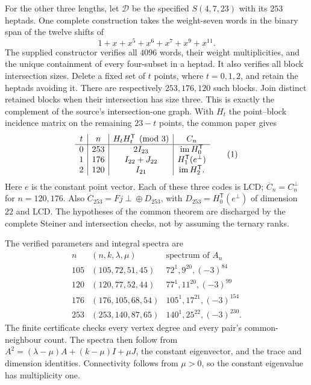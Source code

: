 For the other three lengths, let $\mathcal D$ be the specified
$S(4,7,23)$ with its $253$ heptads. One complete construction takes the
weight-seven words in the binary span of the twelve shifts of
\[
 1+x+x^5+x^6+x^7+x^9+x^{11}.
\]
The supplied constructor verifies all $4096$ words, their weight
multiplicities, and the unique containment of every four-subset in a
heptad. It also verifies all block intersection sizes. Delete a fixed set
of $t$ points, where $t=0,1,2$, and retain the heptads avoiding it. There
are respectively $253,176,120$ such blocks. Join distinct retained blocks
when their intersection has size three. This is exactly the complement
of the source's intersection-one graph. With $H_t$ the point--block
incidence matrix on the remaining $23-t$ points, the common paper
\cite[Theorem~2.2]{U} gives
\[
\begin{array}{c|c|c|c}
 t&n&H_tH_t^{\mathsf T}\pmod3&C_n\\\hline
 0&253&2I_{23}&\operatorname{im} H_0^{\mathsf T}\\
 1&176&I_{22}+J_{22}&H_1^{\mathsf T}(e^\perp)\\
 2&120&I_{21}&\operatorname{im} H_2^{\mathsf T}.
\end{array}                                                    \tag{1}
\]
Here $e$ is the constant point vector. Each of these three codes is LCD;
$\overline C_n=C_n^\perp$ for $n=120,176$. Also
$C_{253}=Fj\mathbin{\perp\!\oplus}D_{253}$, with
$D_{253}=H_0^{\mathsf T}(e^\perp)$ of dimension $22$ and LCD.
The hypotheses of the common theorem are discharged by the complete
Steiner and intersection checks, not by assuming the ternary ranks.

The verified parameters and integral spectra are
\[
\begin{array}{c|c|c}
n&(n,k,\lambda,\mu)&\text{spectrum of }A_n\\\hline
105&(105,72,51,45)&72^1,9^{20},(-3)^{84}\\
120&(120,77,52,44)&77^1,11^{20},(-3)^{99}\\
176&(176,105,68,54)&105^1,17^{21},(-3)^{154}\\
253&(253,140,87,65)&140^1,25^{22},(-3)^{230}.
\end{array}                                                     \tag{2}
\]
The finite certificate checks every vertex degree and every pair's
common-neighbour count. The spectra then follow from
$A^2=(\lambda-\mu)A+(k-\mu)I+\mu J$, the constant eigenvector,
and the trace and dimension identities. Connectivity follows from
$\mu>0$, so the constant eigenvalue has multiplicity one.

